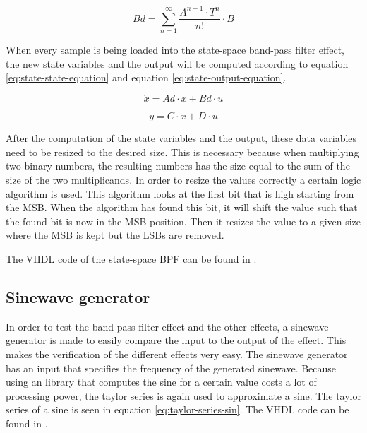 \begin{equation}
    Bd=\sum_{n=1}^{\infty}\frac{A^{n-1}\cdot T^n}{n!}\cdot B
    \label{eq:taylor-series-Bd}
\end{equation}

When every sample is being loaded into the state-space band-pass filter effect, the new state variables and the output will be computed according to equation \ref{eq:state-state-equation} and equation \ref{eq:state-output-equation}. 

\begin{equation}
    \dot{x}=Ad \cdot x + Bd \cdot u
    \label{eq:state-state-equation}
\end{equation}

\begin{equation}
    y=C \cdot x + D \cdot u
    \label{eq:state-output-equation}
\end{equation}

After the computation of the state variables and the output, these data variables need to be resized to the desired size. This is necessary because when multiplying two binary numbers, the resulting numbers has the size equal to the sum of the size of the two multiplicands. In order to resize the values correctly a certain logic algorithm is used. This algorithm looks at the first bit that is high starting from the MSB. When the algorithm has found this bit, it will shift the value such that the found bit is now in the MSB position. Then it resizes the value to a given size where the MSB is kept but the LSBs are removed. 

The VHDL code of the state-space BPF can be found in . 

\subsection{Sinewave generator}
In order to test the band-pass filter effect and the other effects, a sinewave generator is made to easily compare the input to the output of the effect. This makes the verification of the different effects very easy. The sinewave generator has an input that specifies the frequency of the generated sinewave. Because using an library that computes the sine for a certain value costs a lot of processing power, the taylor series is again used to approximate a sine. The taylor series of a sine is seen in equation \ref{eq:taylor-series-sin}. The VHDL code can be found in . 

